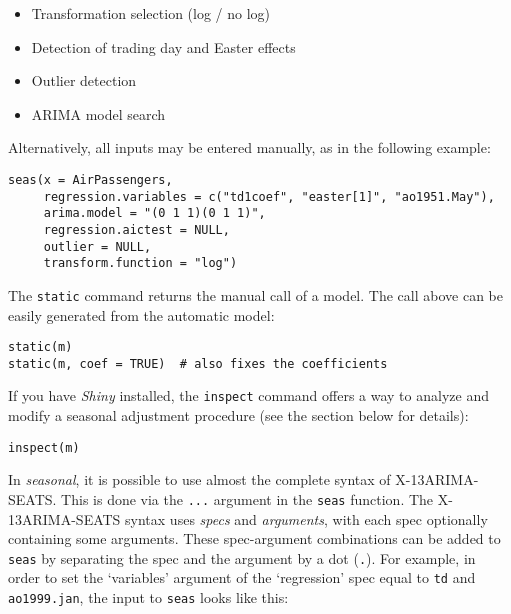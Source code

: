 \begin{itemize}
\itemsep1pt\parskip0pt
\item
  Transformation selection (log / no log)
\item
  Detection of trading day and Easter effects
\item
  Outlier detection
\item
  ARIMA model search
\end{itemize}

Alternatively, all inputs may be entered manually, as in the following
example:

\begin{verbatim}
seas(x = AirPassengers, 
     regression.variables = c("td1coef", "easter[1]", "ao1951.May"), 
     arima.model = "(0 1 1)(0 1 1)", 
     regression.aictest = NULL,
     outlier = NULL, 
     transform.function = "log")
\end{verbatim}

The \texttt{static} command returns the manual call of a model. The call
above can be easily generated from the automatic model:

\begin{verbatim}
static(m)
static(m, coef = TRUE)  # also fixes the coefficients
\end{verbatim}

If you have \emph{Shiny} installed, the \texttt{inspect} command offers
a way to analyze and modify a seasonal adjustment procedure (see the
section below for details):

\begin{verbatim}
inspect(m)
\end{verbatim}


In \emph{seasonal}, it is possible to use almost the complete syntax of
X-13ARIMA-SEATS. This is done via the \texttt{...} argument in the
\texttt{seas} function. The X-13ARIMA-SEATS syntax uses \emph{specs} and
\emph{arguments}, with each spec optionally containing some arguments.
These spec-argument combinations can be added to \texttt{seas} by
separating the spec and the argument by a dot (\texttt{.}). For example,
in order to set the `variables' argument of the `regression' spec equal
to \texttt{td} and \texttt{ao1999.jan}, the input to \texttt{seas} looks
like this:

